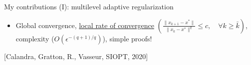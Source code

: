 \documentclass{beamer}
\begin{document}
\begin{frame}{My contributions (I): multilevel adaptive regularization  }
\begin{tcolorbox}[
        title={\faSmile\  Multilevel extension MAR$q$ 
},
    colback=green!10,
    colframe=green!70!black,
        fonttitle=\bfseries,
]
				\begin{itemize}
		\item Global convergence, \underline{local rate of convergence} $\left(\frac{\|x_{k+1}-x^*\|}{\|x_k-x^*\|^q}\leq c, \quad \forall k\geq\bar{k}
\right)$, complexity ($O(\epsilon^{-(q+1)/q})$), simple proofs!
		\end{itemize}



		
		

\end{tcolorbox}

\small{ \textcolor{mygreen}{[Calandra, Gratton, R., Vasseur, SIOPT, 2020]}}


		
\end{frame}

\end{document}
